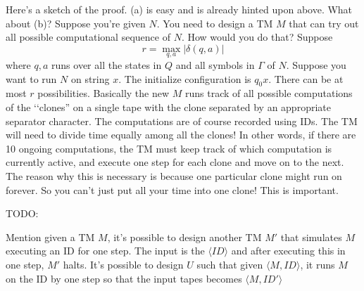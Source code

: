 Here's a sketch of the proof. (a) is easy and is already hinted
upon above. What about (b)? Suppose you're given $N$. You need to
design a TM $M$ that can try out all possible computational
sequence of $N$. How would you do that? Suppose
\[
r = \max_{q,a} | \delta(q,a) |
\]
where $q,a$ runs over all the states in $Q$ and all symbols in
$\Gamma$ of $N$. Suppose you want to run $N$ on string $x$. The
initialize configuration is $q_0x$. There can be at most $r$
possibilities. Basically the new $M$ runs track of all possible
computations of the 
\lq\lq clones'' on a single tape with the
clone separated by an appropriate separator character.
The computations are of course recorded using IDs.
The TM will need to divide time equally among all the clones!
In other words, if there are 10 ongoing computations, 
the TM must keep track of which computation is currently active,
and execute one step for each clone and move on to the next.
The reason why this is necessary is because one particular clone might
run on forever.
So you can't just put all your time into one clone!
This is important.


TODO:
\begin{itemize}
  \li 
  Mention given a TM $M$, it's possible to design another TM $M'$ that
  simulates $M$ executing an ID for one step.
  The input is the $\langle ID \rangle$
  and after executing this in one step,
  $M'$ halts.
  \li It's possible to design $U$ such that
  given $\langle M, ID \rangle$, it runs $M$ on the ID by one step
  so that the input tapes becomes
  $\langle M, ID' \rangle$
\end{itemize}
